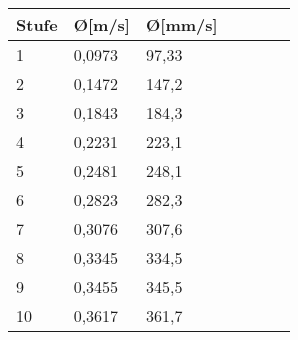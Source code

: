 \begin{figure}[H]
	\begin{center}
		\fontsize{8}{10}\selectfont
		\begin{tabularx}{\linewidth}{|p{0.8cm}|X|X|X|X|X|X|}
			\hline 
			\textbf{Stufe} & \textbf{\O [m/s]} & \textbf{\O [mm/s]} \\ \hline
			
			1 & 0,0973 & 97,33  \\ \hline
			2 & 0,1472 & 147,2  \\ \hline
			3 & 0,1843 & 184,3  \\ \hline
			4 & 0,2231 & 223,1  \\ \hline
			5 & 0,2481 & 248,1  \\ \hline
			6 & 0,2823 & 282,3  \\ \hline
			7 & 0,3076 & 307,6  \\ \hline
			8 & 0,3345 & 334,5  \\ \hline
			9 & 0,3455 & 345,5  \\ \hline
			10 & 0,3617 & 361,7 \\ \hline
			
		\end{tabularx}		
		\label{TestMillimeterSekunde}
	\end{center}
\end{figure}
